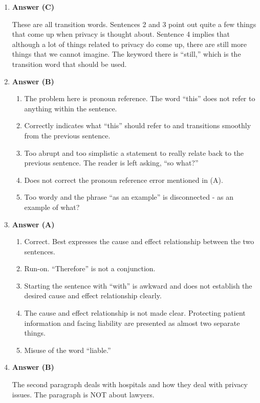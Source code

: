 \begin{enumerate}
\begin{itemize}
\begin{enumerate}
\item \textbf{Answer (C)}

These are all transition words. Sentences 2 and 3 point out quite a few things that come up when privacy is thought about. Sentence 4 implies that although a lot of things related to privacy do come up, there are still more things that we cannot imagine. The keyword there is ``still,'' which is the transition word that should be used.

\item \textbf{Answer (B)}

\begin{enumerate}[label=(\Alph*)]
\item The problem here is pronoun reference. The word ``this'' does not refer to anything within the sentence.
\item Correctly indicates what ``this'' should refer to and transitions smoothly from the previous sentence.
\item Too abrupt and too simplistic a statement to really relate back to the previous sentence. The reader is left asking, ``so what?''
\item Does not correct the pronoun reference error mentioned in (A).
\item Too wordy and the phrase ``as an example'' is disconnected - as an example of what?
\end{enumerate}

\item \textbf{Answer (A)}

\begin{enumerate}[label=(\Alph*)]
\item Correct. Best expresses the cause and effect relationship between the two sentences.
\item Run-on. ``Therefore'' is not a conjunction.
\item Starting the sentence with ``with'' is awkward and does not establish the desired cause and effect relationship clearly.
\item The cause and effect relationship is not made clear. Protecting patient information and facing liability are presented as almost two separate things.
\item Misuse of the word ``liable.''
\end{enumerate}


\item \textbf{Answer (B)}

The second paragraph deals with hospitals and how they deal with privacy issues. The paragraph is NOT about lawyers.


\end{enumerate}
\end{itemize}
\end{enumerate}
